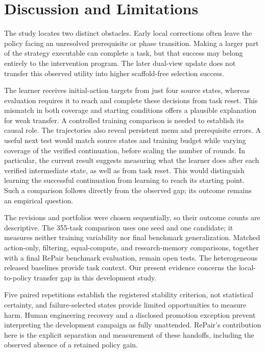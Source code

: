 \section{Discussion and Limitations}
\label{sec:discussion}
The study locates two distinct obstacles. Early local corrections often
leave the policy facing an unresolved prerequisite or phase transition.
Making a larger part of the strategy executable can complete a task, but
that success may belong entirely to the intervention program. The later
dual-view update does not transfer this observed utility into higher
scaffold-free selection success.

The learner receives initial-action targets from just four source states,
whereas evaluation requires it to reach and complete these decisions from
task reset. This mismatch in both coverage and starting conditions offers
a plausible explanation for weak transfer. A controlled training comparison
is needed to establish its causal role. The trajectories
also reveal persistent menu and prerequisite errors. A useful next test
would match source states and training budget while varying coverage of
the verified continuation, before scaling the number of rounds. In particular, the current result
suggests measuring what the learner does after each verified intermediate
state, as well as from task reset. This would distinguish learning the
successful continuation from learning to reach its starting point.
Such a comparison follows directly from the observed gap; its outcome
remains an empirical question.

The revisions and portfolios were chosen sequentially, so their outcome
counts are descriptive. The 355-task comparison uses one seed and one
candidate; it measures neither training variability nor final benchmark
generalization. Matched action-only, filtering, equal-compute, and research-memory
comparisons, together with a final RePair benchmark evaluation, remain
open tests. The heterogeneous released baselines provide task context.
Our present evidence concerns the local-to-policy transfer gap in this
development study.

Five paired repetitions establish the registered stability criterion,
not statistical certainty, and failure-selected states provide limited
opportunities to measure harm. Human engineering recovery and a disclosed
promotion exception prevent interpreting the development campaign as
fully unattended. RePair's contribution here is the explicit separation
and measurement of these handoffs, including the observed absence of a retained policy gain.
